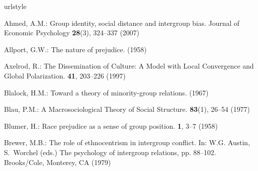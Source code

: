%

%
%
\begin{thebibliography}{10}
	\providecommand{\url}[1]{{#1}}
	\providecommand{\urlprefix}{URL }
	\expandafter\ifx\csname urlstyle\endcsname\relax
	\providecommand{\doi}[1]{DOI~\discretionary{}{}{}#1}\else
	\providecommand{\doi}{DOI~\discretionary{}{}{}\begingroup
		\urlstyle{rm}\Url}\fi
	
	Ahmed, A.M.: Group identity, social distance and intergroup bias.
	\newblock Journal of Economic Psychology \textbf{28}(3), 324--337 (2007)
	
	Allport, G.W.: {The nature of prejudice}.
	 (1958)
	
	Axelrod, R.: {The Dissemination of Culture: A Model with Local Convergence and
		Global Polarization}.
	 \textbf{41}, 203--226 (1997)
	
	Blalock, H.M.: {Toward a theory of minority-group relations}.
	 (1967)
	
	Blau, P.M.: {A Macrosociological Theory of Social Structure}.
	 \textbf{83}(1), 26--54 (1977)
	
	Blumer, H.: {Race prejudice as a sense of group position}.
	 \textbf{1}, 3--7 (1958)
	
	Brewer, M.B.: The role of ethnocentrism in intergroup conflict.
	\newblock In: W.G. Austin, S.~Worchel (eds.) The psychology of intergroup
	relations, pp. 88--102. Brooks/Cole, Monterey, CA (1979)
	

\end{thebibliography}
